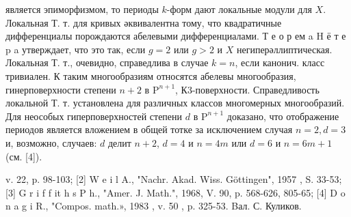 \documentclass[10pt]{article}
\begin{document}
является эпиморфизмом, то периоды $k$-форм дают локальные модули для $X$. Локальная Т. т. для кривых әквивалентна тому, что квадратичные дифференциалы порождаются абелевыми дифференциалами. Т е о р ем a H ё т е p a утверждает, что это так, если $g=2$ или $g>2$ и $X$ негиперәллиптическая. Локальная Т. т., очевидно, справедлива в случае $k=n$, если канонич. класс тривиален. К таким многообразиям относятся абелевы многообразия, гинерповерхности степени $n+2$ в $\mathrm{P}^{n+1}$, К3-поверхности. Справедливость локальной Т. т. установлена для различных классов многомерных многообразий. Для неособых гиперповерхностей степени $d$ в $\mathrm{P}^{n+1}$ доказано, что отображение периодов является вложением в общей тотке за исключением случая $n=2, d=3$ и, возможно, случаев: $d$ делит $n+2$, $d=4$ и $n=4 m$ или $d=6$ и $n=6 m+1$ (см. [4]).



v. 22, p. 98-103; [2] W e i l A., "Nachr. Akad. Wiss. Göttingen", 1957 , S. 33-53; [3] G r i f f it h s P h., "Amer. J. Math.", 1968, V. 90, p. 568-626, 805-65; [4] D o n a g i R., "Compos. math.», 1983 , v. 50 , p. 325-53. Bал. С. Куликов.
\end{document}
